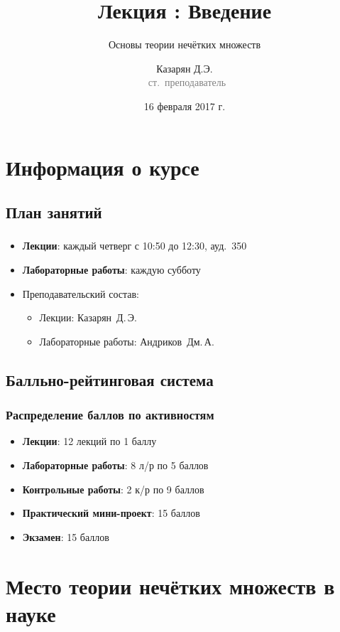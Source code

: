 \documentclass{beamer}
\title{Лекция \textnumero 1: Введение}
\subtitle{Основы теории нечётких множеств}
\author{Казарян Д.Э.\\{\footnotesize\textcolor{gray}{~ст.~преподаватель}}}
\institute{РУДН, Инженерная академия\\Департамент механики и мехатроники}
\date{16 февраля 2017 г.}
\begin{document}
\lstset{language=python}

\frame{\titlepage}

\section{Информация о курсе}

\subsection{План занятий}

\begin{frame}\frametitle{}
    \begin{itemize}
        \item \textbf{Лекции}: каждый четверг с 10:50 до 12:30, ауд.~350
        \item \textbf{Лабораторные работы}: каждую субботу
        \item Преподавательский состав:
        \begin{itemize}
            \item Лекции: Казарян~Д.\,Э.
            \item Лабораторные работы: Андриков~Дм.\,А.
        \end{itemize}
    \end{itemize}
\end{frame}

\subsection{Балльно-рейтинговая система}

\begin{frame}\frametitle{Распределение баллов по активностям}
    \begin{itemize}
        \item \textbf{Лекции}: 12 лекций по 1 баллу
        \item \textbf{Лабораторные работы}: 8 л/р по 5 баллов
        \item \textbf{Контрольные работы}: 2 к/р по 9 баллов
        \item \textbf{Практический мини-проект}: 15 баллов
        \item \textbf{Экзамен}: 15 баллов
    \end{itemize}
\end{frame}

\section{Место теории нечётких множеств в науке}
\end{document}
